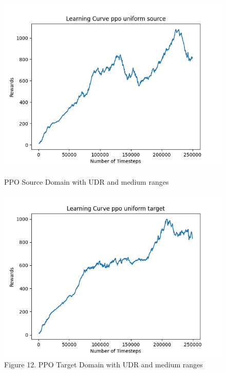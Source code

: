 \documentclass[11pt]{article}
\begin{document}
\begin{figure}[H]
\begin{minipage}{0.45\textwidth}
    \end{minipage}
    \vfill
    \begin{minipage}{0.45\textwidth}
        \centering
        \includegraphics[width=\textwidth]{../images/Learning_Curve_PPO_Uniform_Medium_Source.png}
        \caption{PPO Source Domain with UDR and medium ranges}
        \label{fig:ppo_source_udr_medium}
    \end{minipage}
    \hfill
    \begin{minipage}{0.45\textwidth}
        \centering
        \includegraphics[width=\textwidth]{../images/Learning_Curve_PPO_Uniform_Medium_Target.png}
        \caption{Figure 12. PPO Target Domain with UDR and medium ranges}
        \label{fig:ppo_target_udr_medium}
    \end{minipage}
\end{figure}
\end{document}
